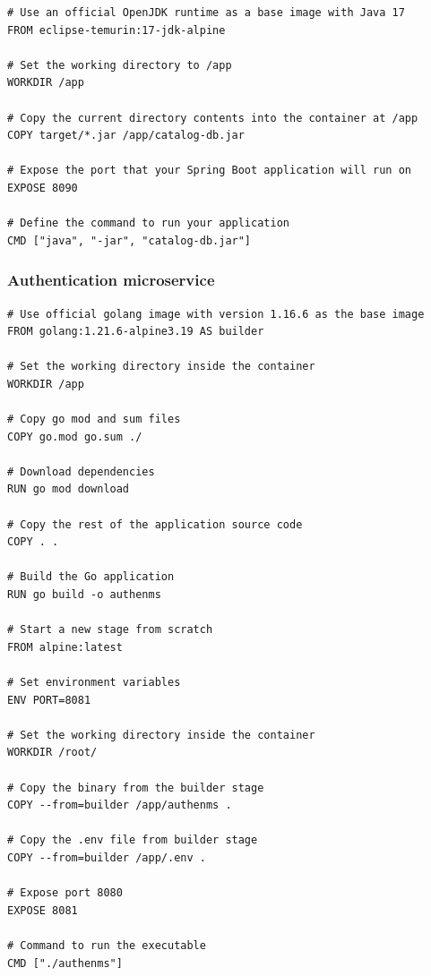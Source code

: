 \begin{lstlisting}[language=docker]
# Use an official OpenJDK runtime as a base image with Java 17
FROM eclipse-temurin:17-jdk-alpine

# Set the working directory to /app
WORKDIR /app

# Copy the current directory contents into the container at /app
COPY target/*.jar /app/catalog-db.jar

# Expose the port that your Spring Boot application will run on
EXPOSE 8090

# Define the command to run your application
CMD ["java", "-jar", "catalog-db.jar"]
\end{lstlisting}

\subsubsection*{Authentication microservice}

\begin{lstlisting}[language=docker]
# Use official golang image with version 1.16.6 as the base image
FROM golang:1.21.6-alpine3.19 AS builder

# Set the working directory inside the container
WORKDIR /app

# Copy go mod and sum files
COPY go.mod go.sum ./

# Download dependencies
RUN go mod download

# Copy the rest of the application source code
COPY . .

# Build the Go application
RUN go build -o authenms

# Start a new stage from scratch
FROM alpine:latest  

# Set environment variables
ENV PORT=8081

# Set the working directory inside the container
WORKDIR /root/

# Copy the binary from the builder stage
COPY --from=builder /app/authenms .

# Copy the .env file from builder stage
COPY --from=builder /app/.env .

# Expose port 8080
EXPOSE 8081

# Command to run the executable
CMD ["./authenms"]
\end{lstlisting}

